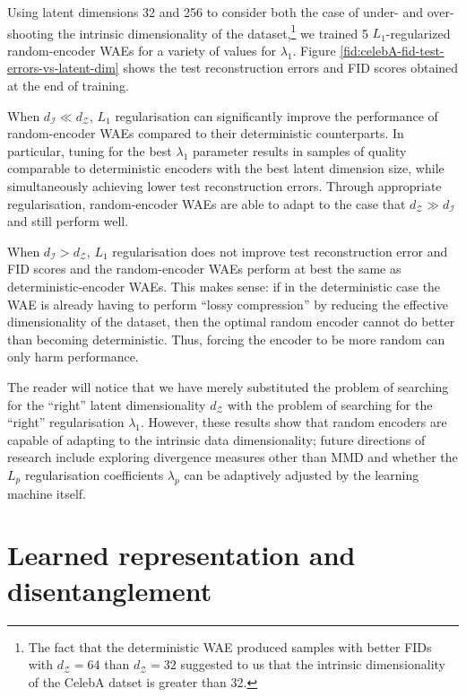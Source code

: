 \documentclass{article}
\def\dZ{d_{\mathcal{Z}}}
\def\dP{d_{\mathcal{I}}}
\def\dI{d_\mathcal{I}}
\begin{document}
Using latent dimensions 32 and 256 to consider both the case of under- and over-shooting the intrinsic dimensionality of the dataset,\footnote{The fact that the deterministic WAE produced samples with better FIDs with $\dZ=64$ than $\dZ=32$ suggested to us that the intrinsic dimensionality of the CelebA datset is greater than 32.} we trained 5 $L_1$-regularized random-encoder WAEs for a variety of values for $\lambda_1$. Figure \ref{fid:celebA-fid-test-errors-vs-latent-dim} shows the test reconstruction errors and FID scores obtained at the end of training.

When $\dI \ll \dZ$, $L_1$ regularisation can significantly improve the performance of random-encoder WAEs compared to their deterministic counterparts. In particular, tuning for the best $\lambda_1$ parameter results in samples of quality comparable to deterministic encoders with the best latent dimension size, while simultaneously achieving lower test reconstruction errors.
Through appropriate regularisation, random-encoder WAEs are able to adapt to the case that $\dZ \gg \dP$ and still perform well.

When $\dI > \dZ$,  $L_1$ regularisation does not improve test reconstruction error and FID scores and the random-encoder WAEs perform at best the same as deterministic-encoder WAEs. This makes sense: if in the deterministic case the WAE is already having to perform ``lossy compression'' by reducing the effective dimensionality of the dataset, then the optimal random encoder cannot do better than becoming deterministic. Thus, forcing the encoder to be more random can only harm performance.


The reader will notice that we have merely substituted the problem of searching for the ``right'' latent dimensionality $\dZ$ with the problem of searching for the ``right'' regularisation $\lambda_1$. 
However, these results show that random encoders are capable of adapting to the intrinsic data dimensionality; future directions of research include exploring divergence measures other than MMD and whether the $L_p$ regularisation coefficients $\lambda_p$ can be adaptively adjusted by the learning machine itself.


\section{\label{section:disentanglement}Learned representation and disentanglement}
\end{document}
